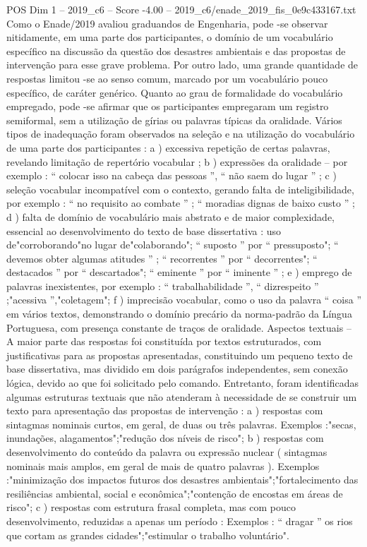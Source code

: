 \begin{textsample}{POS Dim 1 – 2019\_c6 – Score -4.00 – 2019\_c6/enade\_2019\_fis\_0e9c433167.txt}
Como o Enade/2019 avaliou graduandos de Engenharia, pode -se observar nitidamente, em uma parte dos participantes, o domínio de um vocabulário específico na discussão da questão dos desastres ambientais e das propostas de intervenção para esse grave problema.
Por outro lado, uma grande quantidade de respostas limitou -se ao senso comum, marcado por um vocabulário pouco específico, de caráter genérico.
Quanto ao grau de formalidade do vocabulário empregado, pode -se afirmar que os participantes empregaram um registro semiformal, sem a utilização de gírias ou palavras típicas da oralidade.
Vários tipos de inadequação foram observados na seleção e na utilização do vocabulário de uma parte dos participantes : a ) excessiva repetição de certas palavras, revelando limitação de repertório vocabular ; b ) expressões da oralidade – por exemplo : “ colocar isso na cabeça das pessoas ”, “ não saem do lugar ” ; c ) seleção vocabular incompatível com o contexto, gerando falta de inteligibilidade, por exemplo : “ no requisito ao combate ” ; “ moradias dignas de baixo custo ” ; d ) falta de domínio de vocabulário mais abstrato e de maior complexidade, essencial ao desenvolvimento do texto de base dissertativa : uso de"corroborando"no lugar de"colaborando"; “ suposto ” por “ pressuposto"; “ devemos obter algumas atitudes ” ; “ recorrentes ” por “ decorrentes"; “ destacados ” por “ descartados"; “ eminente ” por “ iminente ” ; e ) emprego de palavras inexistentes, por exemplo : “ trabalhabilidade ”, “ dizrespeito ” ;"acessiva ”,"coletagem"; f ) imprecisão vocabular, como o uso da palavra “ coisa ” em vários textos, demonstrando o domínio precário da norma-padrão da Língua Portuguesa, com presença constante de traços de oralidade.
Aspectos textuais – A maior parte das respostas foi constituída por textos estruturados, com justificativas para as propostas apresentadas, constituindo um pequeno texto de base dissertativa, mas dividido em dois parágrafos independentes, sem conexão lógica, devido ao que foi solicitado pelo comando.
Entretanto, foram identificadas algumas estruturas textuais que não atenderam à necessidade de se construir um texto para apresentação das propostas de intervenção : a ) respostas com sintagmas nominais curtos, em geral, de duas ou três palavras.
Exemplos :"secas, inundações, alagamentos";"redução dos níveis de risco"; b ) respostas com desenvolvimento do conteúdo da palavra ou expressão nuclear ( sintagmas nominais mais amplos, em geral de mais de quatro palavras ).
Exemplos :"minimização dos impactos futuros dos desastres ambientais";"fortalecimento das resiliências ambiental, social e econômica";"contenção de encostas em áreas de risco"; c ) respostas com estrutura frasal completa, mas com pouco desenvolvimento, reduzidas a apenas um período : Exemplos : “ dragar ” os rios que cortam as grandes cidades";"estimular o trabalho voluntário".

\end{textsample}
